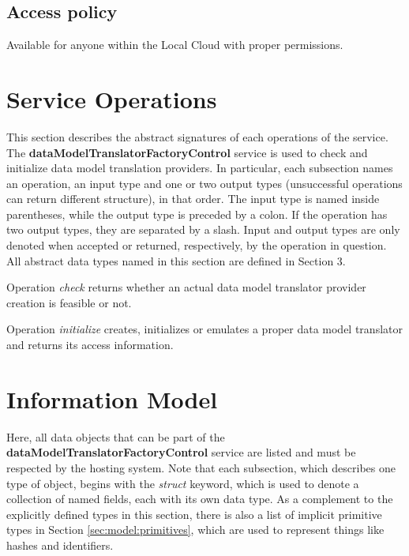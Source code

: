 \documentclass[a4paper]{arrowhead}
\begin{document}
\subsection{Access policy}
\label{sec:accesspolicy}

Available for anyone within the Local Cloud with proper permissions.

\newpage

\section{Service Operations}
\label{sec:functions}

This section describes the abstract signatures of each operations of the service. The \textbf{dataModelTranslatorFactoryControl} service is used to check and initialize data model translation providers.
In particular, each subsection names an operation, an input type and one or two output types (unsuccessful operations can return different structure), in that order.
The input type is named inside parentheses, while the output type is preceded by a colon. If the operation has two output types, they are separated by a slash.
Input and output types are only denoted when accepted or returned, respectively, by the operation in question. All abstract data types named in this section are defined in Section 3.

{}

Operation \textit{check} returns whether an actual data model translator provider creation is feasible or not. 


Operation \textit{initialize} creates, initializes or emulates a proper data model translator and returns its access information.

\clearpage

\section{Information Model}
\label{sec:model}

Here, all data objects that can be part of the \textbf{dataModelTranslatorFactoryControl} service are listed and must be respected by the hosting system.
Note that each subsection, which describes one type of object, begins with the \textit{struct} keyword, which is used to denote a collection of named fields, each with its own data type.
As a complement to the explicitly defined types in this section, there is also a list of implicit primitive types in Section \ref{sec:model:primitives}, which are used to represent things like hashes and identifiers.
\end{document}
